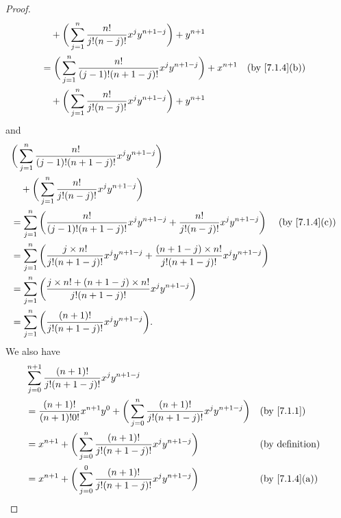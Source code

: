 \begin{proof}
\begin{align*}
                    & \quad + \bigg(\sum_{j = 1}^n \dfrac{n!}{j!(n - j)!} x^j y^{n + 1 - j}\bigg) + y^{n + 1}                                 \\
                    & = \bigg(\sum_{j = 1}^n \dfrac{n!}{(j - 1)!(n + 1 - j)!} x^j y^{n + 1 - j}\bigg) + x^{n + 1} &  & \by{7.1.4}[b]          \\
                    & \quad + \bigg(\sum_{j = 1}^n \dfrac{n!}{j!(n - j)!} x^j y^{n + 1 - j}\bigg) + y^{n + 1}
  \end{align*}
  and
  \begin{align*}
     & \bigg(\sum_{j = 1}^n \dfrac{n!}{(j - 1)!(n + 1 - j)!} x^j y^{n + 1 - j}\bigg)                                                                                           \\
     & \quad + \bigg(\sum_{j = 1}^n \dfrac{n!}{j!(n - j)!} x^j y^{n + 1 - j}\bigg)                                                                                             \\
     & = \sum_{j = 1}^n \bigg(\dfrac{n!}{(j - 1)!(n + 1 - j)!} x^j y^{n + 1 - j} + \dfrac{n!}{j!(n - j)!} x^j y^{n + 1 - j}\bigg)                           &  & \by{7.1.4}[c] \\
     & = \sum_{j = 1}^n \bigg(\dfrac{j \times n!}{j!(n + 1 - j)!} x^j y^{n + 1 - j} + \dfrac{(n + 1 - j) \times n!}{j!(n + 1 - j)!} x^j y^{n + 1 - j}\bigg)                    \\
     & = \sum_{j = 1}^n \bigg(\dfrac{j \times n! + (n + 1 - j) \times n!}{j!(n + 1 - j)!} x^j y^{n + 1 - j}\bigg)                                                              \\
     & = \sum_{j = 1}^n \bigg(\dfrac{(n + 1)!}{j!(n + 1 - j)!} x^j y^{n + 1 - j}\bigg).
  \end{align*}
  We also have
  \begin{align*}
     & \sum_{j = 0}^{n + 1} \dfrac{(n + 1)!}{j!(n + 1 - j)!} x^j y^{n + 1 - j}                                                                                   \\
     & = \dfrac{(n + 1)!}{(n + 1)! 0!} x^{n + 1} y^0 + \bigg(\sum_{j = 0}^n \dfrac{(n + 1)!}{j!(n + 1 - j)!} x^j y^{n + 1 - j}\bigg) &  & \by{7.1.1}             \\
     & = x^{n + 1} + \bigg(\sum_{j = 0}^n \dfrac{(n + 1)!}{j!(n + 1 - j)!} x^j y^{n + 1 - j}\bigg)                                   &  & \text{(by definition)} \\
     & = x^{n + 1} + \bigg(\sum_{j = 0}^0 \dfrac{(n + 1)!}{j!(n + 1 - j)!} x^j y^{n + 1 - j}\bigg)                                   &  & \by{7.1.4}[a]          \\

\end{align*}
\end{proof}
